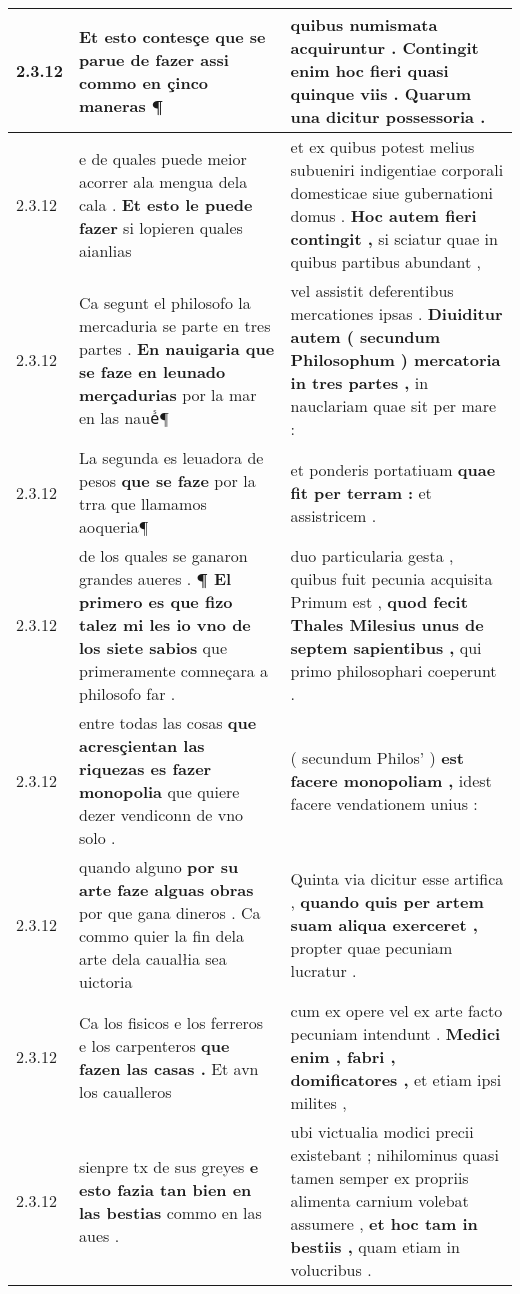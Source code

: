 \begin{tabular}{|p{1cm}|p{6.5cm}|p{6.5cm}|}
2.3.12 & Et esto contesçe \textbf{ que se parue de fazer } assi commo en çinco maneras ¶ & quibus numismata acquiruntur . \textbf{ Contingit enim hoc fieri quasi quinque viis . } Quarum una dicitur possessoria . \\\hline
2.3.12 & e de quales puede meior acorrer ala mengua dela cala . \textbf{ Et esto le puede fazer } si lopieren quales aianlias & et ex quibus potest melius subueniri indigentiae corporali domesticae siue gubernationi domus . \textbf{ Hoc autem fieri contingit , } si sciatur quae in quibus partibus abundant , \\\hline
2.3.12 & Ca segunt el philosofo la mercaduria se parte en tres partes . \textbf{ En nauigaria que se faze en leunado merçadurias } por la mar en las naueᷤ¶ & vel assistit deferentibus mercationes ipsas . \textbf{ Diuiditur autem ( secundum Philosophum ) mercatoria in tres partes , } in nauclariam quae sit per mare : \\\hline
2.3.12 & La segunda es leuadora de pesos \textbf{ que se faze } por la trra que llamamos aoqueria¶ & et ponderis portatiuam \textbf{ quae fit per terram : } et assistricem . \\\hline
2.3.12 & de los quales se ganaron grandes aueres . \textbf{ ¶ El primero es que fizo talez mi les io vno de los siete sabios } que primeramente comneçara a philosofo far . & duo particularia gesta , quibus fuit pecunia acquisita Primum est , \textbf{ quod fecit Thales Milesius unus de septem sapientibus , } qui primo philosophari coeperunt . \\\hline
2.3.12 & entre todas las cosas \textbf{ que acresçientan las riquezas es fazer monopolia } que quiere dezer vendiconn de vno solo . & ( secundum Philos’ ) \textbf{ est facere monopoliam , } idest facere vendationem unius : \\\hline
2.3.12 & quando alguno \textbf{ por su arte faze alguas obras } por que gana dineros . Ca commo quier la fin dela arte dela caualłia sea uictoria & Quinta via dicitur esse artifica , \textbf{ quando quis per artem suam aliqua exerceret , } propter quae pecuniam lucratur . \\\hline
2.3.12 & Ca los fisicos e los ferreros e los carpenteros \textbf{ que fazen las casas . } Et avn los caualleros & cum ex opere vel ex arte facto pecuniam intendunt . \textbf{ Medici enim , fabri , domificatores , } et etiam ipsi milites , \\\hline
2.3.12 & sienpre tx de sus greyes \textbf{ e esto fazia tan bien en las bestias } commo en las aues . & ubi victualia modici precii existebant ; nihilominus quasi tamen semper ex propriis alimenta carnium volebat assumere , \textbf{ et hoc tam in bestiis , } quam etiam in volucribus . \\\hline

\end{tabular}
